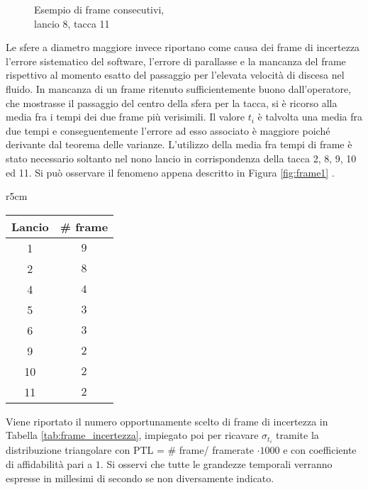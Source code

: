 \documentclass[a4paper,11pt,oneside]{article}
\begin{document}
\begin{figure}[h!] %
    \centering
    \caption{Esempio di frame consecutivi, \\ lancio 8, tacca 11}
\end{figure}
Le sfere a diametro maggiore invece riportano come causa dei frame di incertezza l'errore sistematico del software, l'errore di parallasse e la mancanza del frame rispettivo al momento esatto del passaggio per l'elevata velocità di discesa nel fluido.
In mancanza di un frame ritenuto sufficientemente buono dall'operatore, che mostrasse il passaggio del centro della sfera per la tacca, si è ricorso alla media fra i tempi dei due frame più verisimili. Il valore $t_i$ è talvolta una media fra due tempi e conseguentemente l'errore ad esso associato è maggiore poiché derivante dal teorema delle varianze. L'utilizzo della media fra tempi di frame è stato necessario soltanto nel nono lancio in corrispondenza della tacca 2, 8, 9, 10 ed 11. Si può osservare il fenomeno appena descritto in Figura \ref{fig:frame1} .


\begin{wraptable}{r}{5cm}
\centering
\caption{Frame di incertezza}
\label{tab:frame_incertezza}
\begin{tabular}{|c|c|}
\hline
Lancio & \# frame  \\ \hline
{\rowcolor[rgb]{0.85,0.85,0.85}}1      & $9$ \\ \hline
2      & $8$ \\ \hline
{\rowcolor[rgb]{0.85,0.85,0.85}}4      & $4$ \\ \hline
5      & $3$ \\ \hline
{\rowcolor[rgb]{0.85,0.85,0.85}}6      & $3$ \\ \hline
9      & $2$ \\ \hline
{\rowcolor[rgb]{0.85,0.85,0.85}}10     & $2$ \\ \hline
11     & $2$ \\ \hline
\end{tabular}
\end{wraptable}

Viene riportato il numero opportunamente scelto di frame di incertezza in Tabella \ref{tab:frame_incertezza}, impiegato poi per ricavare $\sigma_{t_{i}}$ tramite la distribuzione triangolare con PTL = \# frame/ framerate $\cdot 1000$ e con coefficiente di affidabilità pari a $1$. Si osservi che tutte le grandezze temporali verranno espresse in millesimi di secondo se non diversamente indicato.\newline
\end{document}
